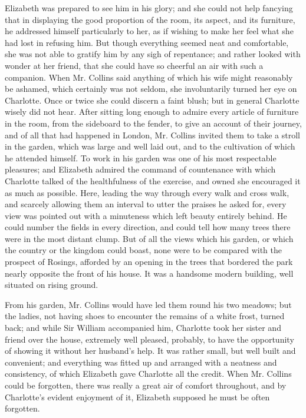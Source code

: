 \documentclass[12pt,openright]{book}
\begin{document}
Elizabeth was prepared to see him in his glory; and she could not help fancying that in displaying the good proportion of the room, its aspect, and its furniture, he addressed himself particularly to her, as if wishing to make her feel what she had lost in refusing him. But though everything seemed neat and comfortable, she was not able to gratify him by any sigh of repentance; and rather looked with wonder at her friend, that she could have so cheerful an air with such a companion. When Mr. Collins said anything of which his wife might reasonably be ashamed, which certainly was not seldom, she involuntarily turned her eye on Charlotte. Once or twice she could discern a faint blush; but in general Charlotte wisely did not hear. After sitting long enough to admire every article of furniture in the room, from the sideboard to the fender, to give an account of their journey, and of all that had happened in London, Mr. Collins invited them to take a stroll in the garden, which was large and well laid out, and to the cultivation of which he attended himself. To work in his garden was one of his most respectable pleasures; and Elizabeth admired the command of countenance with which Charlotte talked of the healthfulness of the exercise, and owned she encouraged it as much as possible. Here, leading the way through every walk and cross walk, and scarcely allowing them an interval to utter the praises he asked for, every view was pointed out with a minuteness which left beauty entirely behind. He could number the fields in every direction, and could tell how many trees there were in the most distant clump. But of all the views which his garden, or which the country or the kingdom could boast, none were to be compared with the prospect of Rosings, afforded by an opening in the trees that bordered the park nearly opposite the front of his house. It was a handsome modern building, well situated on rising ground.

From his garden, Mr. Collins would have led them round his two meadows; but the ladies, not having shoes to encounter the remains of a white frost, turned back; and while Sir William accompanied him, Charlotte took her sister and friend over the house, extremely well pleased, probably, to have the opportunity of showing it without her husband’s help. It was rather small, but well built and convenient; and everything was fitted up and arranged with a neatness and consistency, of which Elizabeth gave Charlotte all the credit. When Mr. Collins could be forgotten, there was really a great air of comfort throughout, and by Charlotte’s evident enjoyment of it, Elizabeth supposed he must be often forgotten.
\end{document}
